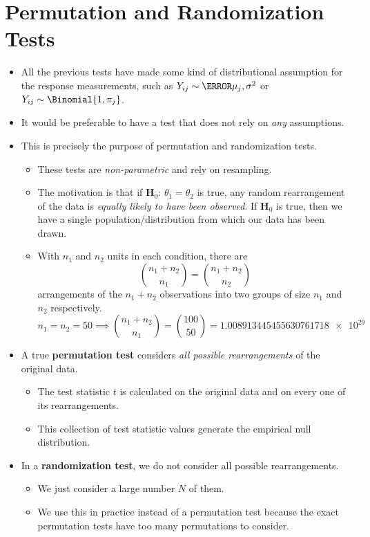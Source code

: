 \section{Permutation and Randomization Tests}
\begin{itemize}
      \item All the previous tests have made some kind of distributional assumption
            for the response measurements, such as $ Y_{ij} \sim \N{\mu_j,\sigma^2} $ or
            $ Y_{ij}\sim \Binomial{1,\pi_j} $.
      \item It would be preferable to have a test that does not rely on \emph{any}
            assumptions.
      \item This is precisely the purpose of permutation and randomization tests.
            \begin{itemize}
                  \item These tests are \emph{non-parametric} and rely on resampling.
                  \item The motivation is that if $ \mathbf{H}_0 $: $ \theta_1=\theta_2 $
                        is true, any random rearrangement of the data is \emph{equally likely
                              to have been observed}. If $ \mathbf{H}_0 $ is true, then we have a single population/distribution
                        from which our data has been drawn.
                  \item With $ n_1 $ and $ n_2 $ units in each condition, there are
                        \[ \binom{n_1+n_2}{n_1}=\binom{n_1+n_2}{n_2} \]
                        arrangements of the $ n_1+n_2 $ observations into two groups of size $ n_1 $
                        and $ n_2 $ respectively.
                        \[ n_1=n_2=50\implies\binom{n_1+n_2}{n_1}=\binom{100}{50}=\num{1.008913445455630761718e29} \]
            \end{itemize}
      \item A true \textbf{permutation test} considers \emph{all possible rearrangements}
            of the original data.
            \begin{itemize}
                  \item The test statistic $ t $ is calculated on the original data and on every one of
                        its rearrangements.
                  \item This collection of test statistic values generate the empirical null distribution.
            \end{itemize}
      \item In a \textbf{randomization test}, we do not
            consider all possible rearrangements.
            \begin{itemize}
                  \item We just consider a large number $ N $ of them.
                  \item We use this in practice instead of a permutation test because
                        the exact permutation tests have too many permutations to consider.
            \end{itemize}
\end{itemize}
